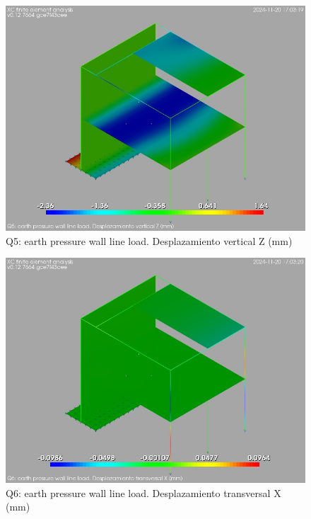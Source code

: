 \begin{figure}[ht]
\begin{center}
\includegraphics[width=\linewidth]{results/graphics/resSimplLC/QearthPWallLinLuZ.png}
\caption{Q5: earth pressure wall line load. Desplazamiento vertical Z (mm)}
\label{QearthPWallLinLuZ}
\end{center}
\end{figure}
\begin{figure}[ht]
\begin{center}
\includegraphics[width=\linewidth]{results/graphics/resSimplLC/QearthPWallHrzLuX.png}
\caption{Q6: earth pressure wall line load. Desplazamiento transversal X (mm)}
\label{QearthPWallHrzLuX}
\end{center}
\end{figure}
